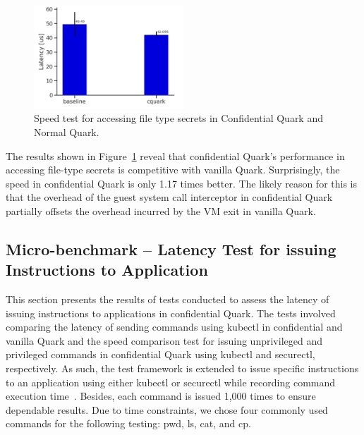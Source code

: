 \begin{figure}[!htb]
    \centering
    \includegraphics[width=0.5\textwidth]{images/reading_speed_of_file_type_secrets_in_Baseline_and_Cquark.PNG}
    \caption[Speed test for accessing file type secrets in Confidential Quark and Normal Quark]{Speed test for accessing file type secrets in Confidential Quark and Normal Quark.}
    \label{fig:reading_speed_of_file_type_secrets_in_Baseline_and_Cquark}
\end{figure}

The results shown in Figure~\ref{fig:reading_speed_of_file_type_secrets_in_Baseline_and_Cquark} reveal that confidential Quark's performance in accessing file-type secrets is competitive with vanilla Quark. Surprisingly, the speed in 
confidential Quark is only 1.17 times better. The likely reason for this is that the overhead of the guest system call interceptor in confidential Quark partially offsets the overhead incurred by the VM exit in vanilla Quark.

\subsection{Micro-benchmark – Latency Test for issuing Instructions to Application}\label{bench_issuing_Instructions}

This section presents the results of tests conducted to assess the latency of issuing instructions to applications in confidential Quark. The tests involved comparing the latency of sending commands using kubectl in confidential and vanilla Quark and the speed comparison test for issuing 
unprivileged and privileged commands in confidential Quark using kubectl and securectl, respectively. As such, the test framework is extended to issue specific instructions to an application using either kubectl or securectl while recording command execution time~\cite*{benchamark_perf_kubectl}. 
Besides, each command is issued 1,000 times to ensure dependable results. Due to time constraints, we chose four commonly used commands for the following testing: pwd, ls, cat, and cp.



